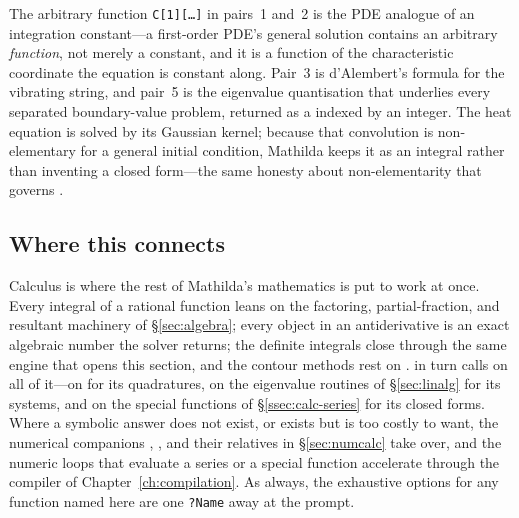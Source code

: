 The arbitrary function \texttt{C[1][\ldots]} in pairs~1 and~2 is the PDE analogue
of an integration constant---a first-order PDE's general solution contains an
arbitrary \emph{function}, not merely a constant, and it is a function of the
characteristic coordinate the equation is constant along. Pair~3 is d'Alembert's
formula for the vibrating string, and pair~5 is the eigenvalue quantisation that
underlies every separated boundary-value problem, returned as a
 indexed by an integer. The heat equation is solved by
its Gaussian kernel; because that convolution is non-elementary for a general
initial condition, Mathilda keeps it as an integral rather than inventing a closed
form---the same honesty about non-elementarity that governs .


\subsection*{Where this connects}

Calculus is where the rest of Mathilda's mathematics is put to work at once.
Every integral of a rational function leans on the factoring, partial-fraction,
and resultant machinery of \S\ref{sec:algebra}; every  object in an
antiderivative is an exact algebraic number the solver returns; the definite
integrals close through the same  engine that opens this section, and the
contour methods rest on .  in turn calls on all of it---on
 for its quadratures, on the eigenvalue routines of \S\ref{sec:linalg}
for its systems, and on the special functions of \S\ref{ssec:calc-series} for its
closed forms. Where a symbolic answer does not exist, or exists but is too costly
to want, the numerical companions , , and their relatives
in \S\ref{sec:numcalc} take over, and the numeric loops that evaluate a
series or a special function accelerate through the compiler of
Chapter~\ref{ch:compilation}. As always, the exhaustive options for any function
named here are one \texttt{?Name} away at the prompt.
